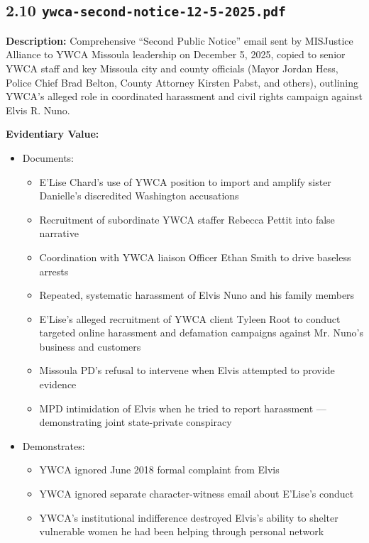 \documentclass[11pt, letterpaper]{article}
\begin{document}
\subsection{2.10 \texttt{ywca-second-notice-12-5-2025.pdf}}

\textbf{Description:} Comprehensive ``Second Public Notice'' email sent by MISJustice Alliance to YWCA Missoula leadership on December 5, 2025, copied to senior YWCA staff and key Missoula city and county officials (Mayor Jordan Hess, Police Chief Brad Belton, County Attorney Kirsten Pabst, and others), outlining YWCA's alleged role in coordinated harassment and civil rights campaign against Elvis R. Nuno.

\textbf{Evidentiary Value:}

\begin{itemize}[leftmargin=*]
  \item Documents:
    \begin{itemize}
      \item E'Lise Chard's use of YWCA position to import and amplify sister Danielle's discredited Washington accusations
      \item Recruitment of subordinate YWCA staffer Rebecca Pettit into false narrative
      \item Coordination with YWCA liaison Officer Ethan Smith to drive baseless arrests
      \item Repeated, systematic harassment of Elvis Nuno and his family members
      \item E'Lise's alleged recruitment of YWCA client Tyleen Root to conduct targeted online harassment and defamation campaigns against Mr. Nuno's business and customers
      \item Missoula PD's refusal to intervene when Elvis attempted to provide evidence
      \item MPD intimidation of Elvis when he tried to report harassment --- demonstrating joint state-private conspiracy
    \end{itemize}
  \item Demonstrates:
    \begin{itemize}
      \item YWCA ignored June 2018 formal complaint from Elvis
      \item YWCA ignored separate character-witness email about E'Lise's conduct
      \item YWCA's institutional indifference destroyed Elvis's ability to shelter vulnerable women he had been helping through personal network

\end{itemize}
\end{itemize}
\end{document}
